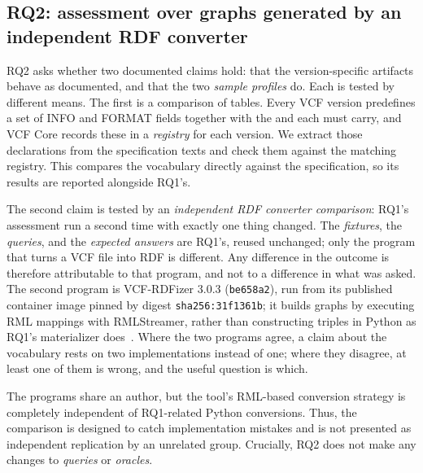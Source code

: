 \subsection{RQ2: assessment over graphs generated by an independent RDF converter}
\label{sec:m-rq2}

RQ2 asks whether two documented claims hold: that the version-specific artifacts behave as documented, and that the two \emph{sample profiles} do.
Each is tested by different means.
The first is a comparison of tables.
Every VCF version predefines a set of INFO and FORMAT fields together with the  and  each must carry, and VCF Core records these in a \emph{registry} for each version.
We extract those declarations from the specification texts and check them against the matching registry.
This compares the vocabulary directly against the specification, so its results are reported alongside RQ1's.

The second claim is tested by an \emph{independent RDF converter comparison}: RQ1's assessment run a second time with exactly one thing changed.
The \emph{fixtures}, the \emph{queries}, and the \emph{expected answers} are RQ1's, reused unchanged; only the program that turns a VCF file into RDF is different.
Any difference in the outcome is therefore attributable to that program, and not to a difference in what was asked.
The second program is VCF-RDFizer 3.0.3 (\texttt{be658a2}), run from its published container image pinned by digest \texttt{sha256:31f1361b}; it builds graphs by executing RML mappings with RMLStreamer, rather than constructing triples in Python as RQ1's materializer does~\cite{vcfrConverter2026}.
Where the two programs agree, a claim about the vocabulary rests on two implementations instead of one; where they disagree, at least one of them is wrong, and the useful question is which.

The programs share an author, but the tool's RML-based conversion strategy is completely independent of RQ1-related Python conversions.
Thus, the comparison is designed to catch implementation mistakes and is not presented as independent replication by an unrelated group.
Crucially, RQ2 does not make any changes to \emph{queries} or \emph{oracles}.


